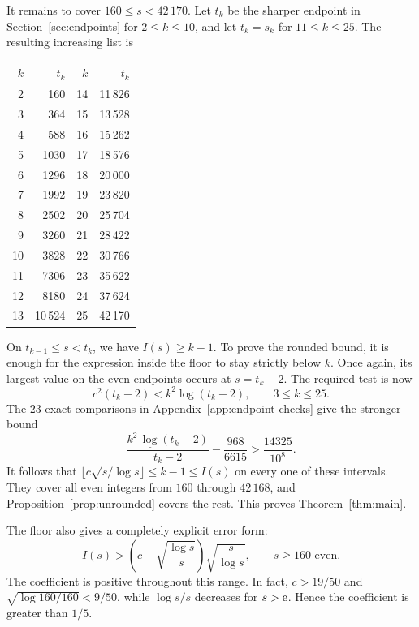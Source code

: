 It remains to cover $160\le s<42\,170$. Let $t_k$ be the
sharper endpoint in Section~\ref{sec:endpoints} for $2\le k\le10$,
and let $t_k=s_k$ for $11\le k\le25$. The resulting increasing
list is
\begin{center}
\begin{tabular}{@{}rr@{\qquad}rr@{}}
\toprule
$k$&$t_k$&$k$&$t_k$\\
\midrule
2&160&14&11\,826\\
3&364&15&13\,528\\
4&588&16&15\,262\\
5&1030&17&18\,576\\
6&1296&18&20\,000\\
7&1992&19&23\,820\\
8&2502&20&25\,704\\
9&3260&21&28\,422\\
10&3828&22&30\,766\\
11&7306&23&35\,622\\
12&8180&24&37\,624\\
13&10\,524&25&42\,170\\
\bottomrule
\end{tabular}
\end{center}
On $t_{k-1}\le s<t_k$, we have $I(s)\ge k-1$. To prove the
rounded bound, it is enough for the expression inside the floor
to stay strictly below $k$. Once again, its largest value on the
even endpoints occurs at $s=t_k-2$. The required test is now
\begin{equation}\label{eq:rounded-endpoint-test}
 c^2(t_k-2)<k^2\log(t_k-2),\qquad 3\le k\le25.
\end{equation}
The $23$ exact comparisons in Appendix~\ref{app:endpoint-checks}
give the stronger bound
\[
 \frac{k^2\,\underline{\log}(t_k-2)}{t_k-2}
        -\frac{968}{6615}>\frac{14325}{10^8}.
\]
It follows that
$\lfloor c\sqrt{s/\log s}\rfloor\le k-1\le I(s)$ on every
one of these intervals. They cover all even integers from $160$
through $42\,168$, and Proposition~\ref{prop:unrounded} covers
the rest. This proves Theorem~\ref{thm:main}.

The floor also gives a completely explicit error form:
\[
 I(s)>\left(c-\sqrt{\frac{\log s}{s}}\right)
                \sqrt{\frac{s}{\log s}},\qquad s\ge160\text{ even}.
\]
The coefficient is positive throughout this range. In fact,
$c>19/50$ and $\sqrt{\log160/160}<9/50$, while $\log s/s$
decreases for $s>\mathrm e$. Hence the coefficient is greater than $1/5$.
